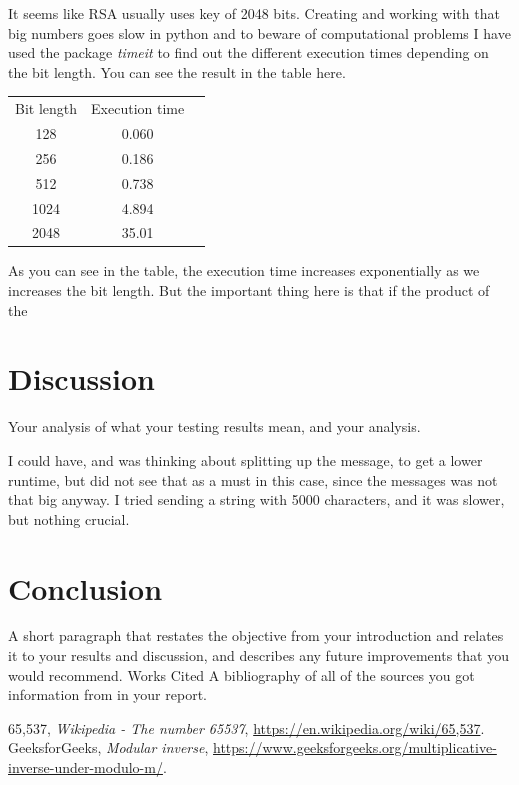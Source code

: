 \documentclass[12pt, letterpaper]{article}
\begin{document}
It seems like RSA usually uses key of 2048 bits. Creating and working with that big numbers goes slow in python and to beware of computational problems I have used the package \textit{timeit} to find out the different execution times depending on the bit length. You can see the result in the table here.

\begin{center}
\begin{tabular}{ |c|c|c| } 
 \hline
 Bit length & Execution time\\
 128 & 0.060 \\ 
 256 & 0.186 \\ 
 512 & 0.738 \\ 
 1024 & 4.894 \\ 
 2048 & 35.01 \\
 \hline
\end{tabular}
\end{center}

As you can see in the table, the execution time increases exponentially as we increases the bit length. But the important thing here is that if the product of the 

\section*{Discussion}
Your analysis of what your testing results mean, and your analysis.

I could have, and was thinking about splitting up the message, to get a lower runtime, but did not see that as a must in this case, since the messages was not that big anyway. I tried sending a string with 5000 characters, and it was slower, but nothing crucial.

\section*{Conclusion}
A short paragraph that restates the objective from your introduction and relates it to your results and discussion, and
describes any future improvements that you would recommend. Works Cited A bibliography of all of the sources
you got information from in your report. 


\begin{thebibliography}{10} 
 65,537,  \emph{Wikipedia - The number 65537},
\url{https://en.wikipedia.org/wiki/65,537}.
 GeeksforGeeks,  \emph{Modular inverse},
\url{https://www.geeksforgeeks.org/multiplicative-inverse-under-modulo-m/}.
\end{thebibliography}
\end{document}
